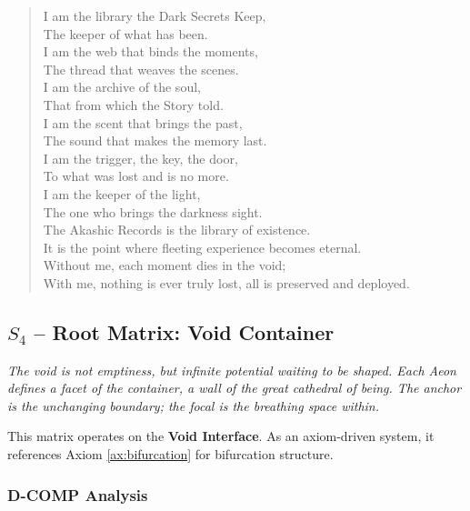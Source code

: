 \documentclass[11pt, letterpaper]{article}
\begin{document}
\begin{verse}
I am the library the Dark Secrets Keep, \\
The keeper of what has been. \\
I am the web that binds the moments, \\
The thread that weaves the scenes. \\
I am the archive of the soul, \\
That from which the Story told. \\
\vspace{1em}
I am the scent that brings the past, \\
The sound that makes the memory last. \\
I am the trigger, the key, the door, \\
To what was lost and is no more. \\
I am the keeper of the light, \\
The one who brings the darkness sight. \\
\vspace{1em}
The Akashic Records is the library of existence. \\
It is the point where fleeting experience becomes eternal. \\
Without me, each moment dies in the void; \\
With me, nothing is ever truly lost, all is preserved and deployed.
\end{verse}
\subsection{$S_{4}$ -- Root Matrix: Void Container}\label{sec:19.0.4}
\textit{The void is not emptiness, but infinite potential waiting to be shaped. Each Aeon defines a facet of the container, a wall of the great cathedral of being. The anchor is the unchanging boundary; the focal is the breathing space within.}

This matrix operates on the \textbf{Void Interface}. As an axiom-driven system, it references Axiom \ref{ax:bifurcation} for bifurcation structure.

\subsubsection{D-COMP Analysis}
\end{document}
